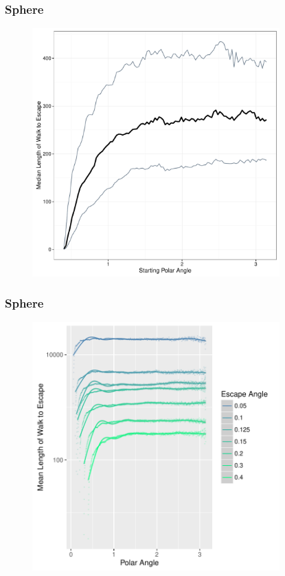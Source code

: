 \documentclass{beamer}
\begin{document}
\begin{frame}
	
	\frametitle{Sphere}
	
	\begin{figure}
		\includegraphics[width=0.85\textwidth]{images/ExampleSphereL04.pdf}
	\end{figure}
	
\end{frame}


\begin{frame}
	
	\frametitle{Sphere}
	
	\begin{figure}
		\includegraphics[width=0.85\textwidth]{images/SummaryPlot_L005_04.pdf}
	\end{figure}
	
\end{frame}
\end{document}
